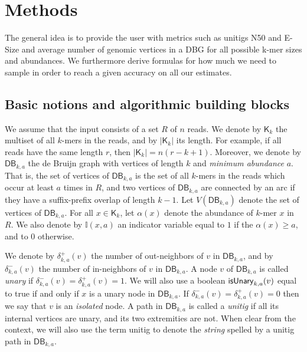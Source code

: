 \documentclass[a4paper,11pt]{article}
\newcommand{\kristoffer}[1]{{\color{red}{#1}}}
\newcommand{\alex}[1]{{\color{blue}{#1}}}
\newcommand{\DB}{\mathsf{DB}_{k,a}}
\newcommand{\dplus}{\delta^+_{k,a}}
\newcommand{\dminus}{\delta^-_{k,a}}
\newcommand{\K}{\mathsf{K}}
\newcommand{\abu}{\alpha}
\newcommand{\isunary}{{\sf isUnary}_{k,a}}
\renewcommand{\geq}{\geqslant}
\begin{document}
\section{Methods} %
\label{sec:methods}

The general idea is to provide the user with metrics such as unitigs N50 and E-Size and average number of genomic vertices in a DBG  for all possible k-mer sizes and abundances. \kristoffer{ We implement a FM-index data structure described in cite XX. This allows us to query a k-mer, its in and out neighbors in O() time. }  We furthermore derive formulas for how much we need to sample in order to reach a given accuracy on all our estimates. 

\alex{Say that one of the main ideas is to do weighted sampling.}

\alex{Say that we compute for all abundances at the same time.}

\alex{Say that we can query every sampled $k$-mer in parallel.}

\subsection{Basic notions and algorithmic building blocks\label{sec:basics}}

We assume that the input consists of a set $R$ of $n$ reads. We denote by $\K_k$ the multiset of all $k$-mers in the reads, and by $|\K_k|$ its length. For example, if all reads have the same length $r$, then $|\K_k| = n(r-k+1)$. Moreover, we denote by $\DB$ the de Bruijn graph with vertices of length $k$ and \emph{minimum abundance} $a$. That is, the set of vertices of $\DB$ is the set of all $k$-mers in the reads which occur at least $a$ times in $R$, and two vertices of $\DB$ are connected by an arc if they have a suffix-prefix overlap of length $k-1$. Let $V(\DB)$ denote the set of vertices of $\DB$. For all $x \in \K_k$, let $\abu(x)$ denote the abundance of $k$-mer $x$ in $R$. We also denote by $\mathbb{I}(x,a)$ an indicator variable equal to $1$ if the $\abu(x) \geq a$, and to $0$ otherwise.

We denote by $\dplus(v)$ the number of out-neighbors of $v$ in $\DB$, and by $\dminus(v)$ the number of in-neighbors of $v$ in $\DB$. A  node $v$ of $\DB$ is called \emph{unary} if $\dminus(v) = \dplus(v) = 1$. We will also use a boolean $\isunary(v)$ equal to true if and only if $x$ is a unary node in $\DB$. If $\dminus(v) = \dplus(v) = 0$ then we say that $v$ is an \emph{isolated} node. A path in $\DB$ is called a \emph{unitig} if all its internal vertices are unary, and its two extremities are not. When clear from the context, we will also use the term unitig to denote the \emph{string} spelled by a unitig path in $\DB$. 
\end{document}
